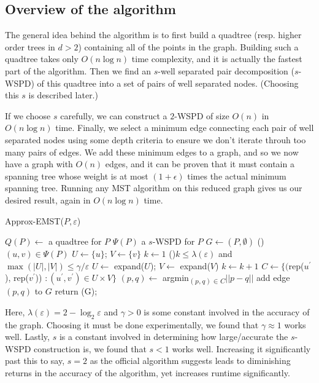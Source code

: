 \documentclass[a4paper, 10pt, twocolumn, twoside]{article}
\begin{document}
\subsection{Overview of the algorithm}

The general idea behind the algorithm is to first build a quadtree (resp. higher order trees in $d>2$) containing all of the points in the graph. Building such a quadtree takes only $O(n\log n)$ time complexity, and it is actually the fastest part of the algorithm. Then we find an $s$-well separated pair decomposition ($s$-WSPD) of this quadtree into a set of pairs of well separated nodes. (Choosing this $s$ is described later.) 

If we choose $s$ carefully, we can construct a $2$-WSPD of size $O(n)$ in $O(n\log n)$ time. Finally, we select a minimum edge connecting each pair of well separated nodes using some depth criteria to ensure we don't iterate throuh too many pairs of edges. We add these minimum edges to a graph, and so we now have a graph with $O(n)$ edges, and it can be proven that it must contain a spanning tree whose weight is at most $(1+\epsilon)$ times the actual minimum spanning tree. Running any MST algorithm on this reduced graph gives us our desired result, again in $O(n\log n)$ time.

\begin{algorithm}
\caption{Approx-EMST($P, \varepsilon$)}
\DontPrintSemicolon
$Q(P) \leftarrow $ a quadtree for $P$\;
$\Psi(P)$ a $s$-WSPD for $P$\;
$G\leftarrow(P,\emptyset)$\; 
\For(){$(u, v) \in \Psi(P)$}{
    $U \leftarrow \{u\}$; $V \leftarrow \{v\}$\;
    $k \leftarrow 1$\;
    \While(){$k \leq \lambda(\varepsilon)$ and $\max(|U|, |V|) \leq \gamma/\varepsilon$}{
        $U \leftarrow $ expand($U$); $V \leftarrow $ expand($V$)\;
        $k \leftarrow k + 1$\;
    }
    $C \leftarrow \{($rep($u^\prime$), rep($v^\prime$)) $ : (u^\prime, v^\prime) \in U \times V\}$\;
    $(p, q) \leftarrow $ argmin\textsubscript{$(p,q)\in C$}$||p-q||$\;
    add edge $(p, q)$ to $G$\;
}
return \kruskals(G);
\end{algorithm}

Here, $\lambda(\varepsilon)=2-\log_2\varepsilon$ and $\gamma>0$ is some constant involved in the accuracy of the graph. Choosing it must be done experimentally, we found that $\gamma\approx 1$ works well. Lastly, $s$ is a constant involved in determining how large/accurate the $s$-WSPD construction is, we found that $s < 1$ works well. Increasing it significantly past this to say, $s=2$ as the official algorithm suggests leads to diminishing returns in the accuracy of the algorithm, yet increases runtime significantly. 
\end{document}
